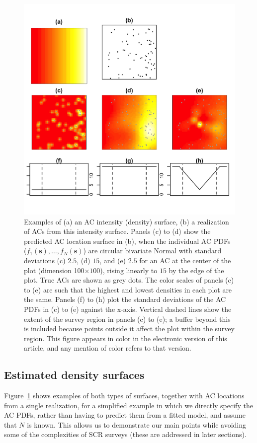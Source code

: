\documentclass[useAMS,usenatbib,referee]{biom}
\begin{document}
\begin{figure}[htbp]
\centering
\includegraphics[width=\textwidth]{example-densities.jpg}
\caption{Examples of (a) an AC intensity (density) surface, (b) a realization of ACs from this intensity surface. Panels (c) to (d) show the predicted AC location surface in (b), when the individual AC PDFs ($f_1(\bm{s}),\ldots,f_N(\bm{s})$) are circular bivariate Normal with standard deviations (c) $2.5$, (d) $15$, and (e) $2.5$ for an AC at the center of the plot (dimension 100$\times100$), rising linearly to $15$ by the edge of the plot. True ACs are shown as grey dots. The color scales of panels (c) to (e) are such that the highest and lowest densities in each plot are the same. Panels (f) to (h) plot the standard deviations of the AC PDFs in (c) to (e) against the x-axis. Vertical dashed lines show the extent of the survey region in panels (c) to (e); a buffer beyond this is included because points outside it affect the plot within the survey region. This figure appears in color in the electronic version of this article, and any mention of color refers to that version.}
\label{fig:densities}
\end{figure}

\subsection{Estimated density surfaces}
Figure~\ref{fig:densities} shows examples of both types of surfaces, together with AC locations from a single realization, for a simplified example in which we directly specify the AC PDFs, rather than having to predict them from a fitted model, and assume that $N$ is known. This allows us to demonstrate our main points while avoiding some of the complexities of SCR surveys (these are addressed in later sections). 
\end{document}
